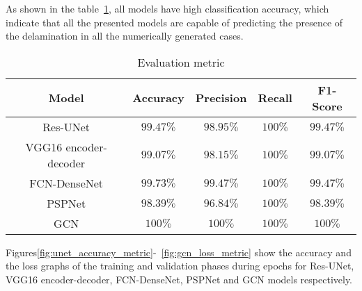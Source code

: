 As shown in the table~\ref{tab:evaluation_metric}, all models have high classification accuracy, which indicate that all the presented models are capable of predicting the presence of the delamination in all the numerically generated cases. 
\begin{table}[]
	\centering
	\caption{Evaluation metric}
	\label{tab:evaluation_metric}
	\resizebox{\textwidth}{!}
	{
		\begin{tabular}{ccccc} \hline
			Model& Accuracy & Precision & Recall & F1-Score \\ \hline
			Res-UNet & \(99.47\%\)  & \(98.95\%\) &  \(100\%\)  & \(99.47\%\)  \\ 
			VGG16 encoder-decoder & \(99.07\%\)  & \(98.15\%\) & \(100\%\) &  \(99.07\%\)\\ 
			FCN-DenseNet & \(99.73\%\)  & \(99.47\%\) & \(100\%\)  & \(99.47\%\) \\ 
			PSPNet & \(98.39\%\) & \(96.84\%\) & \(100\%\) & \(98.39\%\) \\ 
			GCN & \(100\%\) & \(100\%\) & \(100\%\) & \(100\%\) \\ \hline
		\end{tabular}
	}
\end{table}
Figures\ref{fig:unet_accuracy_metric}-~\ref{fig:gcn_loss_metric} show the accuracy and the loss graphs of the training and validation phases during epochs for Res-UNet, VGG16 encoder-decoder, FCN-DenseNet, PSPNet and GCN models respectively.
